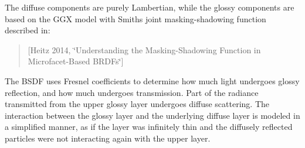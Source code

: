 \begin{DoxyParagraph}{}
The diffuse components are purely Lambertian, while the glossy components are based on the G\+GX model with Smith\textquotesingle{}s joint masking-\/shadowing function described in\+: \begin{quote}
\mbox{[}Heitz 2014, \char`\"{}\+Understanding the Masking-\/\+Shadowing Function in Microfacet-\/\+Based B\+R\+D\+Fs\char`\"{}\mbox{]} \end{quote}

\end{DoxyParagraph}
\begin{DoxyParagraph}{}
The B\+S\+DF uses Fresnel coefficients to determine how much light undergoes glossy reflection, and how much undergoes transmission. Part of the radiance transmitted from the upper glossy layer undergoes diffuse scattering. The interaction between the glossy layer and the underlying diffuse layer is modeled in a simplified manner, as if the layer was infinitely thin and the diffusely reflected particles were not interacting again with the upper layer. 
\end{DoxyParagraph}

